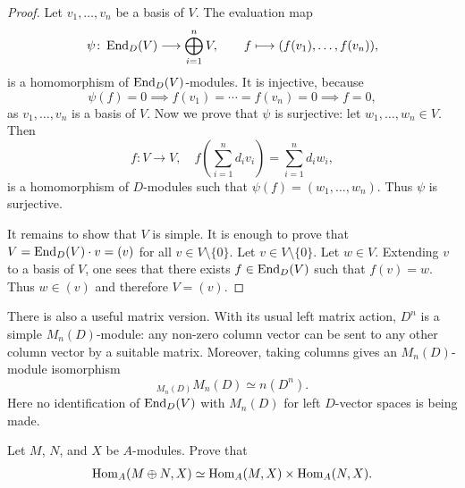%	
%
%
\begin{proof}
 Let $v_1,\dots,v_n$ be a basis of $V$. The evaluation map
 \[
   \psi\colon \operatorname{End}_D(V)\longrightarrow\bigoplus_{i=1}^n V,\qquad
   f\longmapsto(f(v_1),\dots,f(v_n)),
 \]
 is a homomorphism of $\operatorname{End}_D(V)$-modules. It is injective, because  
 \[ 
   \psi(f)=0\implies f(v_1)=\cdots=f(v_n)=0\implies f=0, 
 \]
 as $v_1,\dots,v_n$ is a basis of $V$. Now we prove that 
 $\psi$ is surjective: let 
 $w_1,\dots,w_n\in V$. Then 
 \[
   f\colon V\to V,\quad 
   f\left(\sum_{i=1}^n d_i v_i\right)=\sum_{i=1}^n d_i w_i, 
 \]
 is a homomorphism of $D$-modules such that 
 $\psi(f)=(w_1,\dots,w_n)$.
 Thus $\psi$ is surjective. 

 It remains to show that $V$ is simple. It is enough to prove that
 $V=\operatorname{End}_D(V)\cdot v=(v)$ for all $v\in V\setminus\{0\}$. Let $v\in
 V\setminus\{0\}$. Let $w\in V$. Extending $v$ to a basis of $V$, one sees that
 there exists $f\in\operatorname{End}_D(V)$ such that
 $f(v)=w$. Thus $w\in (v)$ and therefore $V=(v)$.  
\end{proof}

There is also a useful matrix version. With its usual left matrix action,
$D^n$ is a simple $M_n(D)$-module: any non-zero column vector can be
sent to any other column vector by a suitable matrix. Moreover, taking
columns gives an $M_n(D)$-module isomorphism
\[
  {}_{M_n(D)}M_n(D)\simeq n(D^n).
\]
Here no identification of $\operatorname{End}_D(V)$ with $M_n(D)$ for left
$D$-vector spaces is being made.

\begin{exercise}
    Let $M$, $N$, and $X$ be $A$-modules. Prove that 
    \begin{align*}
        \operatorname{Hom}_A(M\oplus N,X)\simeq\operatorname{Hom}_A(M,X)\times\operatorname{Hom}_A(N,X).
    \end{align*}
\end{exercise}

